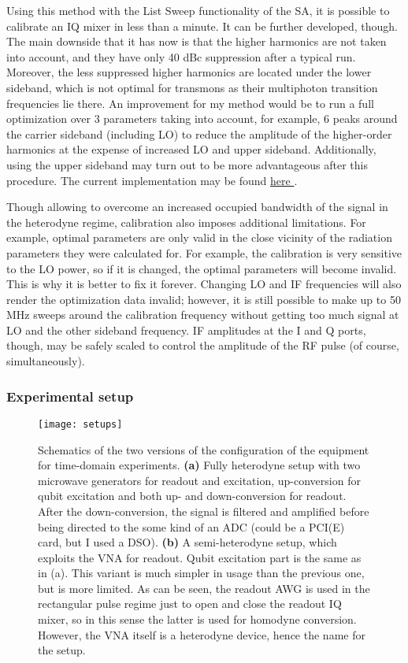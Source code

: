 Using this method with the List Sweep functionality of the SA, it is possible to calibrate an IQ mixer in less than a minute. It can be further developed, though. The main downside that it has now is that the higher harmonics are not taken into account, and they have only 40 dBc suppression after a typical run. Moreover, the less suppressed higher harmonics are located under the lower sideband, which is not optimal for transmons as their multiphoton transition frequencies lie there. An improvement for my method would be to run a full optimization over 3 parameters taking into account, for example, 6 peaks around the carrier sideband (including LO) to reduce the amplitude of the higher-order harmonics at the expense of increased LO and upper sideband. Additionally, using the upper sideband may turn out to be more advantageous after this procedure. The current implementation may be found \href{https://github.com/vdrhtc/Measurement-automation/blob/master/lib/iq_mixer_calibration.py}{here \footnotesize{\faExternalLink}}.

Though allowing to overcome an increased occupied bandwidth of the signal in the heterodyne regime, calibration also imposes additional limitations. For example, optimal parameters are only valid in the close vicinity of the radiation parameters they were calculated for. For example, the calibration is very sensitive to the LO power, so if it is changed, the optimal parameters will become invalid. This is why it is better to fix it forever. Changing LO and IF frequencies will also render the optimization data invalid; however, it is still possible to make up to 50 MHz sweeps around the calibration frequency without getting too much signal at LO and the other sideband frequency. IF amplitudes at the I and Q ports, though, may be safely scaled to control the amplitude of the RF pulse (of course, simultaneously).

\subsubsection{Experimental setup}
\begin{figure}[t]
\texttt{[image: setups]}
\caption{Schematics of the two versions of the configuration of the equipment for time-domain experiments. \textbf{(a)} Fully heterodyne setup with two microwave generators for readout and excitation, up-conversion for qubit excitation and both up- and down-conversion for readout. After the down-conversion, the signal is filtered and amplified before being directed to the some kind of an ADC (could be a PCI(E) card, but I used a DSO). \textbf{(b)} A semi-heterodyne setup, which exploits the VNA for readout. Qubit excitation part is the same as in (a). This variant is much simpler in usage than the previous one, but is more limited. As can be seen, the readout AWG is used in the rectangular pulse regime just to open and close the readout IQ mixer, so in this sense the latter is used for homodyne conversion. However, the VNA itself is a heterodyne device, hence the name for the setup.}
\label{fig:td_setups}
\end{figure}


